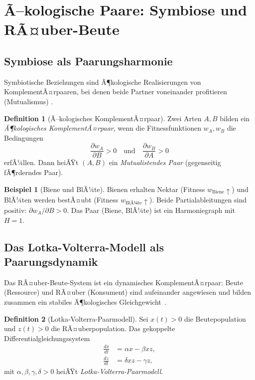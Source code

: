 ﻿\documentclass[a4paper,12pt]{article}
\theoremstyle{definition}
\newtheorem{definition}{Definition}
\newtheorem{beispiel}{Beispiel}
\begin{document}
\section{Ã–kologische Paare: Symbiose und RÃ¤uber-Beute}
\label{sec:oekologie}

\subsection{Symbiose als Paarungsharmonie}

Symbiotische Beziehungen sind Ã¶kologische Realisierungen von KomplementÃ¤rpaaren,
bei denen beide Partner voneinander profitieren (Mutualismus) \cite{may1972}.

\begin{definition}[Ã–kologisches KomplementÃ¤rpaar]
	Zwei Arten $A, B$ bilden ein \emph{Ã¶kologisches KomplementÃ¤rpaar}, wenn
	die Fitnessfunktionen $w_A, w_B$ die Bedingungen
	\[
		\frac{\partial w_A}{\partial B} > 0 \quad\text{und}\quad
		\frac{\partial w_B}{\partial A} > 0
	\]
	erfÃ¼llen. Dann heiÃŸt $(A, B)$ ein \emph{Mutualistendes Paar} (gegenseitig
	fÃ¶rderndes Paar).
\end{definition}

\begin{beispiel}[Biene und BlÃ¼te]
	Bienen erhalten Nektar (Fitness $w_\mathrm{Biene} \uparrow$) und BlÃ¼ten werden
	bestÃ¤ubt (Fitness $w_\mathrm{BlÃ¼te} \uparrow$). Beide Partialableitungen sind
	positiv: $\partial w_A / \partial B > 0$. Das Paar (Biene, BlÃ¼te) ist ein
	Harmoniegraph mit $H = 1$.
\end{beispiel}

\subsection{Das Lotka-Volterra-Modell als Paarungsdynamik}

Das RÃ¤uber-Beute-System ist ein dynamisches KomplementÃ¤rpaar: Beute (Ressource) und
RÃ¤uber (Konsument) sind aufeinander angewiesen und bilden zusammen ein stabiles
Ã¶kologisches Gleichgewicht~\cite{lotka1925,volterra1926}.

\begin{definition}[Lotka-Volterra-Paarmodell]
	Sei $x(t) > 0$ die Beutepopulation und $z(t) > 0$ die RÃ¤uberpopulation.
	Das gekoppelte Differentialgleichungssystem
	\begin{align}
		\frac{dx}{dt} &= \alpha x - \beta x z, \label{eq:beute} \\
		\frac{dz}{dt} &= \delta x z - \gamma z, \label{eq:raeuber}
	\end{align}
	mit $\alpha, \beta, \gamma, \delta > 0$ heiÃŸt \emph{Lotka-Volterra-Paarmodell}.
\end{definition}
\end{document}
